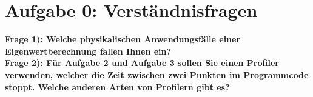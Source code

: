 \section*{Aufgabe 0: Verständnisfragen}

\textbf{Frage 1): Welche physikalischen Anwendungsfälle einer Eigenwertberechnung fallen Ihnen ein?}\\

\textbf{Frage 2): Für Aufgabe 2 und Aufgabe 3 sollen Sie einen Profiler verwenden, welcher die Zeit zwischen zwei Punkten im Programmcode stoppt. Welche anderen Arten von Profilern gibt es?}\\
